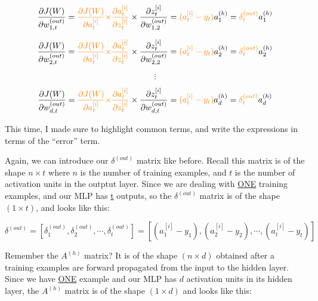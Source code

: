\documentclass[12pt, letterpaper]{article}
\begin{document}
\vspace{5mm} %

\[
    \frac{\partial J(W)}{\partial w_{1,t}^{(out)}} = 
    \textcolor{orange}{\frac{\partial J(W)}{\partial a_{t}^{[i]}}\times}
    \textcolor{orange}{\frac{\partial a_{t}^{[i]}}{\partial z_{t}^{[i]}}}\times
    \frac{\partial z_{t}^{[i]}}{\partial w_{1,2}^{(out)}} =
    \textcolor{orange}{(a_{t}^{[i]} - y_t)}a_1^{(h)}=
    \textcolor{orange}{\delta_t^{(out)}}a_1^{(h)}
\]

\[
    \frac{\partial J(W)}{\partial w_{2,t}^{(out)}} = 
    \textcolor{orange}{\frac{\partial J(W)}{\partial a_{t}^{[i]}}\times}
    \textcolor{orange}{\frac{\partial a_{t}^{[i]}}{\partial z_{t}^{[i]}}}\times
    \frac{\partial z_{t}^{[i]}}{\partial w_{2,2}^{(out)}} =
    \textcolor{orange}{(a_{t}^{[i]} - y_t)}a_2^{(h)}=
    \textcolor{orange}{\delta_t^{(out)}}a_2^{(h)}
\]

\[\vdots\]

\[
    \frac{\partial J(W)}{\partial w_{d,t}^{(out)}} = 
    \textcolor{orange}{\frac{\partial J(W)}{\partial a_{t}^{[i]}}\times}
    \textcolor{orange}{\frac{\partial a_{t}^{[i]}}{\partial z_{t}^{[i]}}} \times
    \frac{\partial z_{t}^{[i]}}{\partial w_{d,t}^{(out)}} =
    \textcolor{orange}{(a_{t}^{[i]} - y_t)}a_d^{(h)}=
    \textcolor{orange}{\delta_t^{(out)}}a_d^{(h)}
\]

\vspace{5mm} %

This time, I made sure to highlight common terms, and write the
expressions in terms of the ``error'' term.

\vspace{5mm} %

Again, we can introduce our $\delta^{(out)}$ matrix like before.
Recall this matrix is of the shape $n \times t$ where $n$ is the
number of training examples, and $t$ is the number of activation
units in the outptut layer. Since we are dealing with \underline{ONE}
training examples, and our MLP has \underline{t} outputs, so the
$\delta^{(out)}$ matrix is of the shape $(1 \times t)$, and looks
like this:

\[
    \delta^{(out)} = [\delta_1^{(out)}, \delta_2^{(out)}, \cdots, \delta_t^{(out)}] =
    [(a_{1}^{[i]} - y_1), (a_{2}^{[i]} - y_2), \cdots, (a_{t}^{[i]} - y_t)]
\]

Remember the $A^{(h)}$ matrix? It is of the shape $(n \times d)$
obtained after a training examples are forward propagated from the
input to the hidden layer. Since we have \underline{ONE} example
and our MLP has \underline{$d$} activation units in its hidden
layer, the $A^{(h)}$ matrix is of the shape $(1 \times d)$ and 
looks like this:
\end{document}
